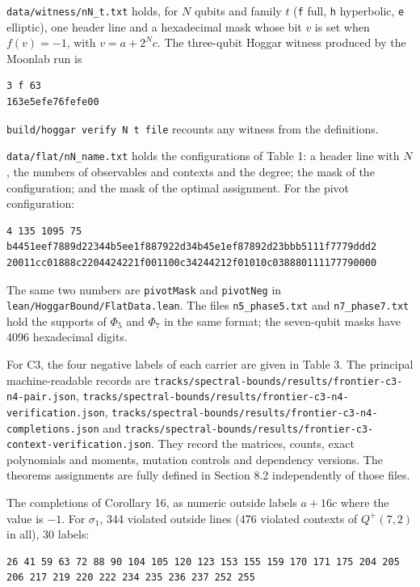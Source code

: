 \documentclass[11pt,a4paper]{article}
\begin{document}
\nolinkurl{data/witness/nN_t.txt} holds, for \(N\) qubits and family \(t\) (\texttt{f} full, \texttt{h} hyperbolic, \texttt{e} elliptic), one
header line and a hexadecimal mask whose bit \(v\) is set when \(f(v) = -1\), with \(v = a + 2^N c\). The
three-qubit Hoggar witness produced by the Moonlab run is

\begin{verbatim}
3 f 63
163e5efe76fefe00
\end{verbatim}

\texttt{build/hoggar\ verify\ N\ t\ file} recounts any witness from the definitions.

\nolinkurl{data/flat/nN_name.txt} holds the configurations of Table 1: a header line with \(N\), the numbers of
observables and contexts and the degree; the mask of the configuration; and the mask of the optimal
assignment. For the pivot configuration:

\begin{verbatim}
4 135 1095 75
b4451eef7889d22344b5ee1f887922d34b45e1ef87892d23bbb5111f7779ddd2
20011cc01888c2204424221f001100c34244212f01010c038880111177790000
\end{verbatim}

The same two numbers are \texttt{pivotMask} and \texttt{pivotNeg} in \nolinkurl{lean/HoggarBound/FlatData.lean}. The files
\texttt{n5\_phase5.txt} and \texttt{n7\_phase7.txt} hold the supports of \(\Phi_5\) and \(\Phi_7\) in the same format; the
seven-qubit masks have 4096 hexadecimal digits.

For C3, the four negative labels of each carrier are given in Table 3. The principal machine-readable
records are \nolinkurl{tracks/spectral-bounds/results/frontier-c3-n4-pair.json}, \nolinkurl{tracks/spectral-bounds/results/frontier-c3-n4-verification.json},
\nolinkurl{tracks/spectral-bounds/results/frontier-c3-n4-completions.json} and \nolinkurl{tracks/spectral-bounds/results/frontier-c3-context-verification.json}.
They record the matrices, counts, exact polynomials and moments, mutation controls and dependency
versions. The theorem\textquotesingle s assignments are fully defined in Section 8.2 independently of those files.

The completions of Corollary 16, as numeric outside labels \(a+16c\) where the value is \(-1\). For
\(\sigma_1\), 344 violated outside lines (476 violated contexts of \(Q^+(7,2)\) in all), 30 labels:

\begin{verbatim}
26 41 59 63 72 88 90 104 105 120 123 153 155 159 170 171 175 204 205 206 217 219 220 222 234 235 236 237 252 255
\end{verbatim}
\end{document}
